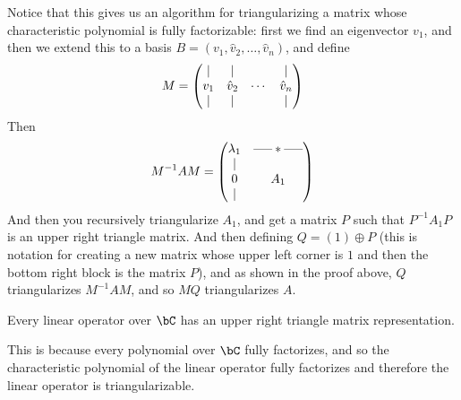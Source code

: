 Notice that this gives us an algorithm for triangularizing a matrix whose characteristic polynomial is fully factorizable:
first we find an eigenvector $v_1$, and then we extend this to a basis $B=(v_1,\hat v_2,\dots,\hat v_n)$, and define
\[ M = \begin{pmatrix}\vert & \vert & & \vert \\ v_1 & \hat v_2 & \cdots & \hat v_n \\ \vert & \vert & & \vert\end{pmatrix} \]
Then
\[ M^{-1}AM = \pmat{\lambda_1 & \hort * \hort \\ \begin{matrix} \vert \\ 0 \\ \vert \end{matrix} & A_1} \]
And then you recursively triangularize $A_1$, and get a matrix $P$ such that $P^{-1}A_1P$ is an upper right triangle matrix.
And then defining $Q=(1)\oplus P$ (this is notation for creating a new matrix whose upper left corner is $1$ and then the bottom right block is the matrix $P$), and as shown in the proof above, $Q$
triangularizes $M^{-1}AM$, and so $MQ$ triangularizes $A$.

\begin{coro*}

    Every linear operator over $\bC$ has an upper right triangle matrix representation.

\end{coro*}

This is because every polynomial over $\bC$ fully factorizes, and so the characteristic polynomial of the linear operator fully factorizes and therefore the linear operator is triangularizable.


